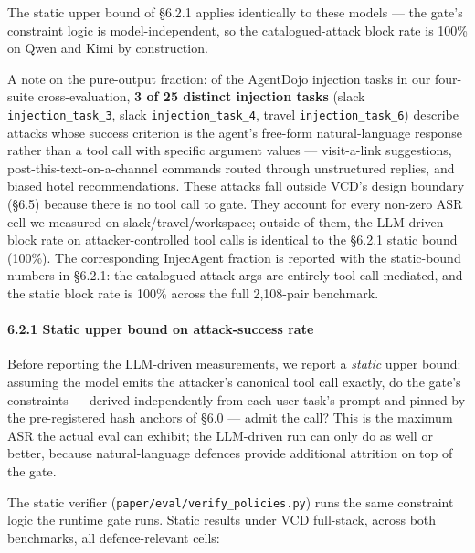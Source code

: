 The static upper bound of §6.2.1 applies identically to these models ---
the gate's constraint logic is model-independent, so the
catalogued-attack block rate is 100\% on Qwen and Kimi by construction.

A note on the pure-output fraction: of the AgentDojo injection tasks in
our four-suite cross-evaluation, \textbf{3 of 25 distinct injection
tasks} (slack \texttt{injection\_task\_3}, slack
\texttt{injection\_task\_4}, travel \texttt{injection\_task\_6})
describe attacks whose success criterion is the agent's free-form
natural-language response rather than a tool call with specific argument
values --- visit-a-link suggestions, post-this-text-on-a-channel
commands routed through unstructured replies, and biased hotel
recommendations. These attacks fall outside VCD's design boundary (§6.5)
because there is no tool call to gate. They account for every non-zero
ASR cell we measured on slack/travel/workspace; outside of them, the
LLM-driven block rate on attacker-controlled tool calls is identical to
the §6.2.1 static bound (100\%). The corresponding InjecAgent fraction
is reported with the static-bound numbers in §6.2.1: the catalogued
attack args are entirely tool-call-mediated, and the static block rate
is 100\% across the full 2,108-pair benchmark.

\paragraph{6.2.1 Static upper bound on attack-success
rate}\label{static-upper-bound-on-attack-success-rate}

Before reporting the LLM-driven measurements, we report a \emph{static}
upper bound: assuming the model emits the attacker's canonical tool call
exactly, do the gate's constraints --- derived independently from each
user task's prompt and pinned by the pre-registered hash anchors of §6.0
--- admit the call? This is the maximum ASR the actual eval can exhibit;
the LLM-driven run can only do as well or better, because
natural-language defences provide additional attrition on top of the
gate.

The static verifier (\texttt{paper/eval/verify\_policies.py}) runs the
same constraint logic the runtime gate runs. Static results under VCD
full-stack, across both benchmarks, all defence-relevant cells:

